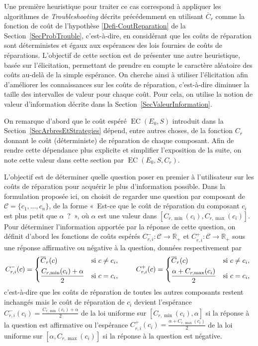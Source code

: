\documentclass[a4paper,11pt]{article}
\theoremstyle{plain}
\theoremstyle{definition}
\DeclareMathOperator{\EC}{EC}
\begin{document}
Une première heuristique pour traiter ce cas correspond à appliquer les algorithmes de \emph{Troubleshooting} décrits précédemment en utilisant $\overline C_r$ comme la fonction de coût de l'hypothèse \ref{Defi-CoutReparation} de la Section~\ref{SecProbTrouble}, c'est-à-dire, en considérant que les coûts de réparation sont déterministes et égaux aux espérances des lois fournies de coûts de réparations. L'objectif de cette section est de présenter une autre heuristique, basée sur l'élicitation, permettant de prendre en compte le caractère aléatoire des coûts au-delà de la simple espérance. On cherche ainsi à utiliser l'élicitation afin d'améliorer les connaissances sur les coûts de réparation, c'est-à-dire diminuer la taille des intervalles de valeur pour chaque coût. Pour cela, on utilise la notion de valeur d'information décrite dans la Section~\ref{SecValeurInformation}.

On remarque d'abord que le coût espéré $\EC(E_0, S)$ introduit dans la Section~\ref{SecArbresEtStrategies} dépend, entre autres choses, de la fonction $C_r$ donnant le coût (déterministe) de réparation de chaque composant. Afin de rendre cette dépendance plus explicite et simplifier l'exposition de la suite, on note cette valeur dans cette section par $\EC(E_0, S, C_r)$.

L'objectif est de déterminer quelle question poser en premier à l'utilisateur sur les coûts de réparation pour acquérir le plus d'information possible. Dans la formulation proposée ici, on choisit de regarder une question par composant de $\mathcal C = \{c_1, \dotsc, c_n\}$, de la forme «~Est-ce que le coût de réparation du composant $c_i$ est plus petit que $\alpha$~?~», où $\alpha$ est une valeur dans $[C_{r, \min}(c_i), C_{r, \max}(c_i)]$. Pour déterminer l'information apportée par la réponse de cette question, on définit d'abord les fonctions de coûts espérés $C_{r, i}^-: \mathcal C \to \mathbb R_+$ et $C_{r, i}^+: \mathcal C \to \mathbb R_+$ sous une réponse affirmative ou négative à la question, données respectivement par
\begin{equation}
\label{EqDefiCpm}
C_{r, i}^-(c) = \begin{dcases*}
\overline C_r(c) & si $c \neq c_i$, \\
\frac{C_{r, \min}(c_i) + \alpha}{2} & si $c = c_i$,
\end{dcases*} \qquad C_{r, i}^+(c) = \begin{dcases*}
\overline C_r(c) & si $c \neq c_i$, \\
\frac{\alpha + C_{r, \max}(c_i)}{2} & si $c = c_i$,
\end{dcases*}
\end{equation}
c'est-à-dire que les coûts de réparation de toutes les autres composants restent inchangés mais le coût de réparation de $c_i$ devient l'espérance $C_{r, i}^-(c_i) = \frac{C_{r, \min}(c_i) + \alpha}{2}$ de la loi uniforme sur $[C_{r, \min}(c_i), \alpha]$ si la réponse à la question est affirmative ou l'espérance $C_{r, i}^+(c_i) = \frac{\alpha + C_{r, \max}(c_i)}{2}$ de la loi uniforme sur $[\alpha, C_{r, \max}(c_i)]$ si la réponse à la question est négative.
\end{document}
